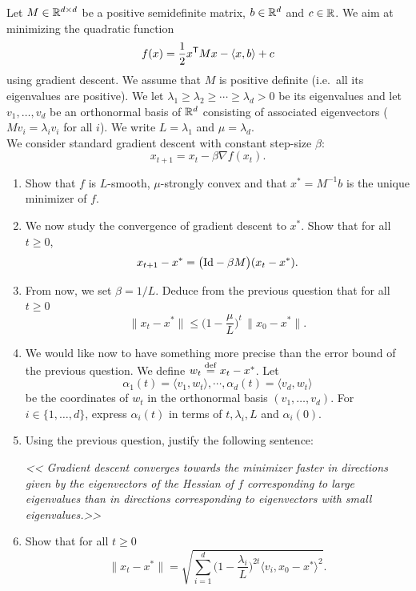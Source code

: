 \documentclass[11pt,nocut]{article}
\begin{document}
\begin{problem}[5 points]\label{p:grad}
	Let $M \in \mathbb{R}^{d \times d}$ be a positive semidefinite matrix, $b \in \mathbb{R}^d$ and $c \in \mathbb{R}$. We aim at minimizing the quadratic function
	$$
	f(x) = \frac{1}{2} x^{{\sf T}} M x - \langle x,b \rangle + c
	$$
	using gradient descent. 
	We assume that $M$ is positive definite (i.e.\ all its eigenvalues are positive).
	We let $\lambda_1 \geq \lambda_2 \geq \cdots \geq \lambda_d >0$ be its eigenvalues and let $v_1, \dots, v_d$ be an orthonormal basis of $\mathbb{R}^d$ consisting of associated eigenvectors ($Mv_i = \lambda_i v_i$ for all $i$).
	We write $L = \lambda_1$ and $\mu = \lambda_d$.
	\\

	We consider standard gradient descent with constant step-size $\beta$:
$$
x_{t+1} = x_t - \beta \nabla f(x_t).
$$
	\begin{enumerate}[label=\normalfont(\textbf{\alph*})]
		\item Show that $f$ is $L$-smooth, $\mu$-strongly convex and that $x^* = M^{-1} b$ is the unique minimizer of $f$.
		\item We now study the convergence of gradient descent to $x^*$. Show that for all $t \geq 0$,
			$$
			x_{t+1} - x^* = \big({{\rm Id}} - \beta M \big)(x_t - x^*).
			$$
		\item From now, we set $\beta = 1/L$. Deduce from the previous question that for all $t \geq 0$
			$$
			\|x_t - x^* \| \leq \Big(1- \frac{\mu}{L}\Big)^{\! t} \, \|x_0 - x^*\|.
			$$
		\item We would like now to have something more precise than the error bound of the previous question. We define $w_t \overset{\rm def}{=} x_t -x^*$. Let 
			$$
			\alpha_1(t) = \langle v_1, w_t \rangle, \cdots, \alpha_d(t) = \langle v_d, w_t \rangle
			$$
			be the coordinates of $w_t$ in the orthonormal basis $(v_1, \dots, v_d)$.
			For $i \in \{1, \dots, d\}$, express $\alpha_i(t)$ in terms of $t,\lambda_i,L$ and $\alpha_i(0)$. 
		\item Using the previous question, justify the following sentence:
			\begin{center}
			\emph{
				<< Gradient descent converges towards the minimizer faster in directions given  by the eigenvectors of the Hessian of $f$ corresponding to large eigenvalues than in directions corresponding to eigenvectors with small eigenvalues.>>
			}
			\end{center}
		\item Show that for all $t \geq 0$
			$$
			\|x_t - x^* \| = \sqrt{\sum_{i=1}^d \Big(1-\frac{\lambda_i}{L}\Big)^{\!2t} \big\langle v_i, x_0-x^* \big\rangle^2}.
			$$
	\end{enumerate}
\end{problem}
\end{document}
